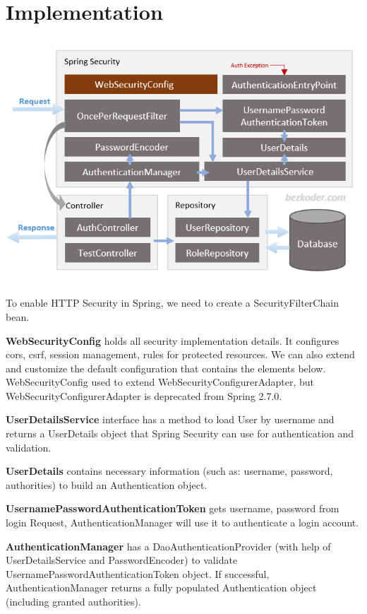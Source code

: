 \section{Implementation}

\includegraphics[width=\textwidth]{./images/chapter-tx/spring-boot-security-jwt.png}

To enable HTTP Security in Spring, we need to create a SecurityFilterChain bean.


\textbf{WebSecurityConfig} holds all security implementation details. It configures cors, csrf, session management, rules for protected resources. We can also extend and customize the default configuration that contains the elements below.
WebSecurityConfig used to extend WebSecurityConfigurerAdapter, but WebSecurityConfigurerAdapter is deprecated from Spring 2.7.0.


\textbf{UserDetailsService} interface has a method to load User by username and returns a UserDetails object that Spring Security can use for authentication and validation.

\textbf{UserDetails} contains necessary information (such as: username, password, authorities) to build an Authentication object.

\textbf{UsernamePasswordAuthenticationToken} gets {username, password} from login Request, AuthenticationManager will use it to authenticate a login account.

\textbf{AuthenticationManager} has a DaoAuthenticationProvider (with help of UserDetailsService and PasswordEncoder) to validate UsernamePasswordAuthenticationToken object. If successful, AuthenticationManager returns a fully populated Authentication object (including granted authorities).

